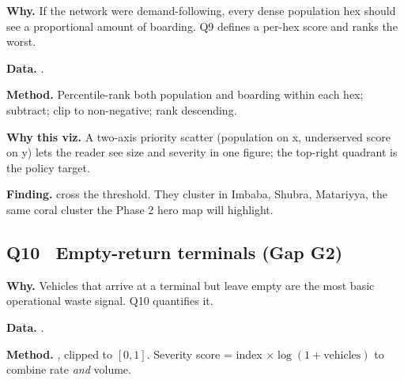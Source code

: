 \textbf{Why.} If the network were demand-following, every dense
population hex should see a proportional amount of boarding. Q9
defines a per-hex score
 and
ranks the worst.

\textbf{Data.} .

\textbf{Method.} Percentile-rank both population and boarding within
each hex; subtract; clip to non-negative; rank descending.


\textbf{Why this viz.} A two-axis priority scatter (population on x,
underserved score on y) lets the reader see size and severity in one
figure; the top-right quadrant is the policy target.

\textbf{Finding.}  cross the 
threshold. They cluster in Imbaba, Shubra, Matariyya, the same
coral cluster the Phase 2 hero map will highlight. 

\subsection{Q10 \textbullet\ Empty-return terminals (Gap G2)}

\textbf{Why.} Vehicles that arrive at a terminal but leave empty are
the most basic operational waste signal. Q10 quantifies it.

\textbf{Data.} .

\textbf{Method.} ,
clipped to $[0, 1]$. Severity score = index $\times \log(1 + \text{vehicles})$ to
combine rate \emph{and} volume.


